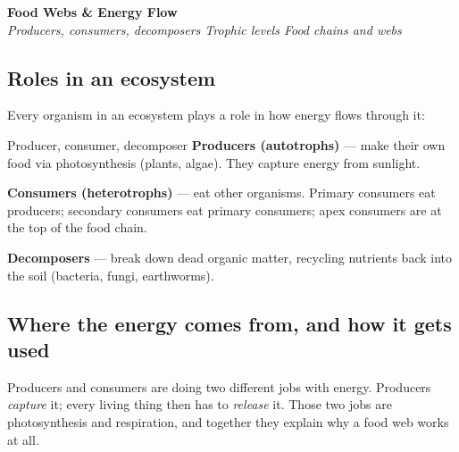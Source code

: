 \documentclass[11pt,a4paper]{article}
\newcommand{\sectiondiv}[3]{%
  \needspace{5\baselineskip}
  \begin{tcolorbox}[
    enhanced, breakable=false, arc=3.5mm,
    colback=ForestDark, colframe=ForestDark, boxrule=0pt,
    sidebyside, sidebyside align=center,
    lefthand width=2.0cm,
    left=2mm, right=4mm, top=4mm, bottom=4mm
  ]
    \begin{center}
      \label{sec:#1}%
      {\headingfont\bfseries\color{Forest!35!ForestDark}\fontsize{50}{50}\selectfont #1}
    \end{center}
    \tcblower
    {\headingfont\bfseries\color{white}\LARGE #2}\\[3pt]
    {\itshape\color{white!75!ForestDark}\small #3}
  \end{tcolorbox}%
}
\begin{document}
\newpage

\sectiondiv{6}{Food Webs \& Energy Flow}{Producers, consumers, decomposers \textbullet{} Trophic levels \textbullet{} Food chains and webs}

\subsection{Roles in an ecosystem}

Every organism in an ecosystem plays a role in how energy flows through it:

\begin{infobox}{Producer, consumer, decomposer}
\textbf{Producers (autotrophs)} --- make their own food via photosynthesis (plants, algae). They capture energy from sunlight.

\textbf{Consumers (heterotrophs)} --- eat other organisms. Primary consumers eat producers; secondary consumers eat primary consumers; apex consumers are at the top of the food chain.

\textbf{Decomposers} --- break down dead organic matter, recycling nutrients back into the soil (bacteria, fungi, earthworms).
\end{infobox}


\subsection{Where the energy comes from, and how it gets used}

Producers and consumers are doing two different jobs with energy. Producers \emph{capture} it; every living thing then has to \emph{release} it. Those two jobs are photosynthesis and respiration, and together they explain why a food web works at all.
\end{document}
